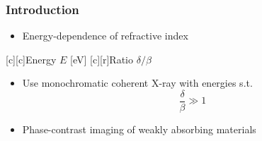 \documentclass{beamer}
\begin{document}
\begin{frame}
  \frametitle{Introduction}
  \begin{itemize}
  \item Energy-dependence of refractive index
  \end{itemize}
  \centering
  { %
      [c][c]{\scriptsize Energy $E$ [\si{eV}]}
      [c][r]{\scriptsize Ratio $\delta / \beta$}
    }
    \begin{itemize}
    \item Use monochromatic coherent X-ray with energies s.t.
      \begin{equation*} 
      \frac{\delta}{\beta} \gg 1
    \end{equation*}
\item Phase-contrast imaging of weakly absorbing materials
  \end{itemize}
\end{frame}
\end{document}
